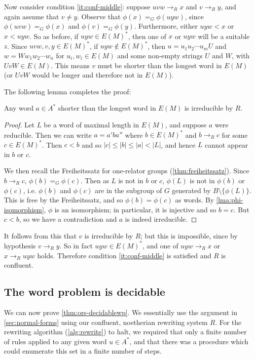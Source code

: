 \documentclass[noindex,noinsetproof,emphthm,12pt]{lmaths}
\begin{document}
Now consider condition \ref{it:conf-middle}: suppose $uvw \to_R x$ and $v \to_R y$, and again assume that $v \ne y$. Observe that $\phi(x) =_G \phi(uyw)$, since $\phi(uvw) =_G \phi(x)$ and $\phi(v) =_G \phi(y)$. Furthermore, either $uyw < x$ or $x < uyw$. So as before, if $uyw \in E(M)^*$, then one of $x$ or $uyw$ will be a suitable $z$. Since $uvw, v, y \in E(M)^*$, if $uyw \not\in E(M)^*$, then $u = u_1u_2 \cdots u_m U$ and $w = W w_1 w_2 \cdots w_n$ for $u_i, w_i \in E(M)$ and some non-empty strings $U$ and $W$, with $UvW \in E(M)$. This means $v$ must be shorter than the longest word in $E(M)$ (or $UvW$ would be longer and therefore not in $E(M)$).

The following lemma completes the proof:

\begin{lemma} \label{lma:shorter-irreducible}
	Any word $a \in A^*$ shorter than the longest word in $E(M)$ is irreducible by $R$.
\end{lemma}
\begin{proof}
	Let $L$ be a word of maximal length in $E(M)$, and suppose $a$ were reducible. Then we can write $a = a'ba''$ where $b \in E(M)^*$ and $b \to_R c$ for some $c \in E(M)^*$. Then $c < b$ and so $|c| \le |b| \le |a| < |L|$, and hence $L$ cannot appear in $b$ or $c$.
	
	We then recall the Freiheitssatz for one-relator groups (\cref{thm:freiheitssatz}).	Since $b \to_R c$, $\phi(b) =_G \phi(c)$. Then as $L$ is not in $b$ or $c$, $\phi(L)$ is not in $\phi(b)$ or $\phi(c)$, i.e. $\phi(b)$ and $\phi(c)$ are in the subgroup of $G$ generated by $B \setminus \{\phi(L)\}$. This is free by the Freiheitssatz, and so $\phi(b) = \phi(c)$ as words. By \cref{lma:phi-isomorphism}, $\phi$ is an isomorphism; in particular, it is injective and so $b = c$. But $c < b$, so we have a contradiction and $a$ is indeed irreducible.
\end{proof}

It follows from this that $v$ is irreducible by $R$; but this is impossible, since by hypothesis $v \to_R y$. So in fact $uyw \in E(M)^*$, and one of $uyw \to_R x$ or $x \to_R uyw$ holds. Therefore condition \ref{it:conf-middle} is satisfied and $R$ is confluent.


\subsection{The word problem is decidable}

We can now prove \cref{thm:ors-decidablewp}. We essentially use the argument in \cref{sec:normal-forms} using our confluent, noetherian rewriting system $R$. For the rewriting algorithm (\cref{alg:rewrite}) to halt, we required that only a finite number of rules applied to any given word $u \in A^*$, and that there was a procedure which could enumerate this set in a finite number of steps.
\end{document}
